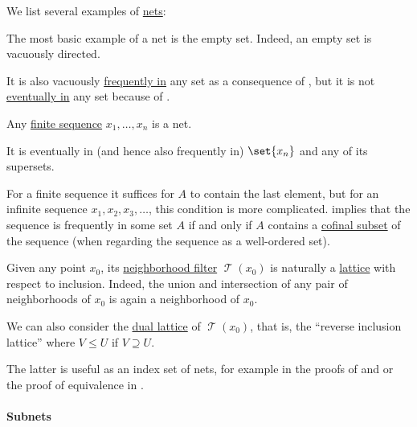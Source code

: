 \begin{example}\label{ex:def:topological_net}
  We list several examples of \hyperref[def:topological_net]{nets}:
  \begin{thmenum}
     The most basic example of a net is the empty set. Indeed, an empty set is vacuously directed.

    It is also vacuously \hyperref[def:net_frequently_in]{frequently in} any set as a consequence of , but it is not \hyperref[def:net_eventually_in]{eventually in} any set because of .

     Any \hyperref[def:sequence]{finite sequence} \( x_1, \ldots, x_n \) is a net.

    It is eventually in (and hence also frequently in) \( \set{ x_n } \) and any of its supersets.

     For a finite sequence it suffices for \( A \) to contain the last element, but for an infinite sequence \( x_1, x_2, x_3, \ldots \), this condition is more complicated.  implies that the sequence is frequently in some set \( A \) if and only if \( A \) contains a \hyperref[def:cofinal_set]{cofinal subset} of the sequence (when regarding the sequence as a well-ordered set).

     Given any point \( x_0 \), its \hyperref[def:neighborhood_filter]{neighborhood filter} \( \mscrT(x_0) \) is naturally a \hyperref[def:semilattice/lattice]{lattice} with respect to inclusion. Indeed, the union and intersection of any pair of neighborhoods of \( x_0 \) is again a neighborhood of \( x_0 \).

    We can also consider the \hyperref[def:semilattice/duality]{dual lattice} of \( \mscrT(x_0) \), that is, the \enquote{reverse inclusion lattice} where \( V \leq U \) if \( V \supseteq U \).

    The latter is useful as an index set of nets, for example in the proofs of  and  or the proof of equivalence in .
  \end{thmenum}
\end{example}

\paragraph{Subnets}

